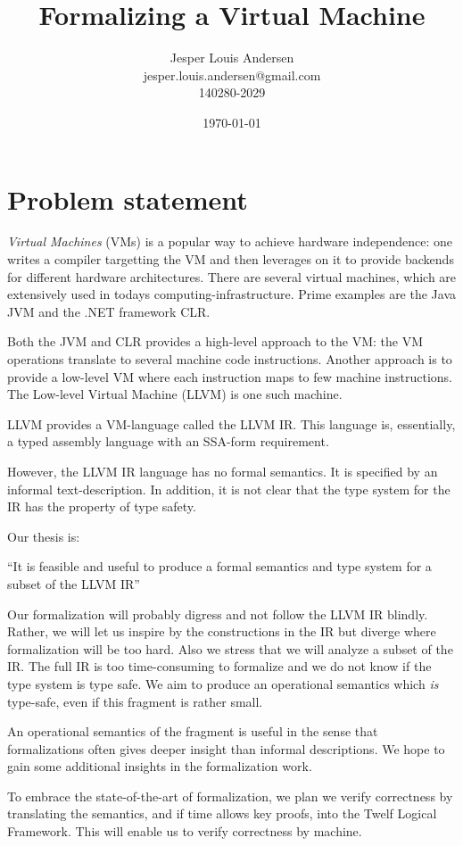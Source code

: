 \documentclass[a4paper, oneside, 10pt, final]{memoir}
\author{Jesper Louis
  Andersen\\jesper.louis.andersen@gmail.com\\140280-2029}
\title{Formalizing a Virtual Machine}
\date{\today}
\begin{document}
\maketitle{}
\chapter*{Problem statement}

\emph{Virtual Machines} (VMs) is a popular way to achieve hardware
independence: one writes a compiler targetting the VM and then
leverages on it to provide backends for different hardware
architectures. There are several virtual machines, which are
extensively used in todays computing-infrastructure. Prime examples
are the Java JVM and the .NET framework CLR.

Both the JVM and CLR provides a high-level approach to the VM: the VM
operations translate to several machine code instructions. Another
approach is to provide a low-level VM where each instruction maps to
few machine instructions. The Low-level Virtual Machine (LLVM) is one
such machine.

LLVM provides a VM-language called the LLVM IR. This language is,
essentially, a typed assembly language with an
SSA-form\cite{appel:1998:modern} requirement.

However, the LLVM IR language has no formal semantics. It is specified by an
informal text-description. In addition, it is not clear that the type
system for the IR has the property of type safety\cite{pierce:2002:types}.

Our thesis is:

``It is feasible and useful to produce a formal semantics and type
system for a subset of the LLVM IR''

Our formalization will probably digress and not follow the LLVM IR
blindly. Rather, we will let us inspire by the constructions in the IR
but diverge where formalization will be too hard. Also we stress that
we will analyze a subset of the IR. The full IR is too time-consuming
to formalize and we do not know if the type system is type safe. We
aim to produce an operational semantics which \emph{is} type-safe,
even if this fragment is rather small.

An operational semantics of the fragment is useful in the sense that
formalizations often gives deeper insight than informal
descriptions. We hope to gain some additional insights in the
formalization work.

To embrace the state-of-the-art of formalization, we plan we verify
correctness by translating the semantics, and if time allows key
proofs, into the Twelf Logical Framework. This will enable us to
verify correctness by machine.
\end{document}
